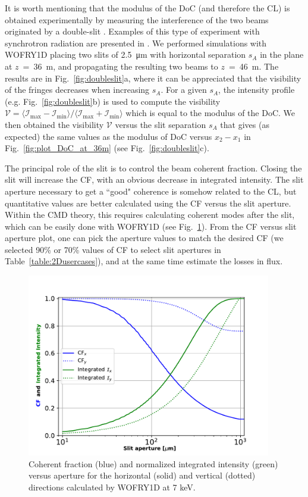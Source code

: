 \documentclass[preprint]{iucr}
\newcommand{\inred}[1]{{\color{red}#1}}
\begin{document}
It is worth mentioning that the modulus of the DoC (and therefore the CL) is obtained experimentally by measuring the interference of the two beams originated by a double-slit \cite{ThompsonWolf1957}. Examples of this type of experiment with synchrotron radiation are presented in \cite{Chang2000, Paterson2001, Leitenberger2003, Tran2005}. We performed simulations with WOFRY1D placing two slits of \SI{2.5}{\micro\meter} with horizontal separation $s_A$ in the plane at $z$~=~\SI{36}{\meter}, and propagating the resulting two beams to $z$~=~\SI{46}{\meter}. The results are in Fig.~\ref{fig:doubleslit}a, where it can be appreciated that the visibility of the fringes decrease\inred{s} when increasing $s_A$. For a given $s_A$, the intensity profile (e.g. Fig.~\ref{fig:doubleslit}b) is used to compute the visibility $\mathcal{V}=\langle \mathcal{I}_{\text{max}}-\mathcal{I}_{\text{min}} \rangle\big/\langle \mathcal{I}_{\text{max}}+\mathcal{I}_{\text{min}}\rangle$ which is equal to the modulus of the DoC. We then obtained the visibility $\mathcal{V}$ versus the slit separation $s_A$ that gives (as expected) the same values as the modulus of DoC versus $x_2-x_1$ in Fig.~\ref{fig:plot_DoC_at_36m} (see Fig.~\ref{fig:doubleslit}c). 

The principal role of the slit is to control the beam coherent fraction. Closing the slit will increase the CF, with an obvious decrease in integrated intensity. The slit aperture necessary to get a ``good" coherence is somehow related to the CL, but quantitative values are better calculated using the CF versus the slit aperture. Within the CMD theory, this requires calculat\inred{ing} coherent modes after the slit, \inred{which} can be easily done with WOFRY1D (see Fig.~\ref{fig:CFvsGap}). From the CF versus slit aperture plot, one can pick the aperture values to match the desired CF (we selected 90\% or 70\% values of CF to select slit apertures in Table~\ref{table:2Dusercases}), and at the same time estimate the los\inred{s}es in flux.

\begin{figure}
    \label{fig:CFvsGap}
    \includegraphics[width=0.95\textwidth]{figures/CFvsGap.pdf}
    \caption{Coherent fraction (blue) and normalized integrated intensity (green) versus aperture for the horizontal (solid) and vertical (dotted) directions calculated by WOFRY1D at 7 keV.
    }
\end{figure}
\end{document}
